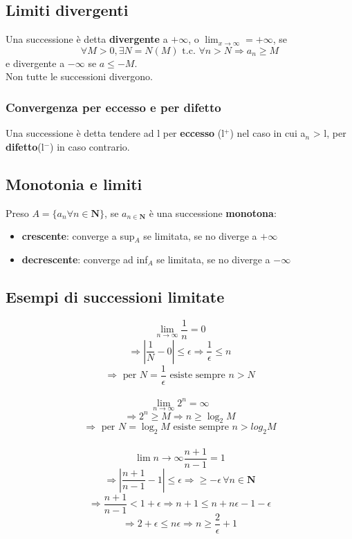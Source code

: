 \documentclass{report}
\begin{document}
    \subsection{Limiti divergenti}
        Una successione è detta \textbf{divergente} a $+\infty$, o 
        $\lim_{x \to \infty} = +\infty$, se $$\forall M > 0, \exists N = N\left(M\right)
        \textrm{ t.c. } \forall n > N \Longrightarrow a_n \geq M$$ e divergente a 
        $-\infty$ se $a \leq -M$. \\
        Non tutte le successioni divergono.
        \subsubsection{Convergenza per eccesso e per difetto}
            Una successione è detta tendere ad l per \textbf{eccesso} (l$^+$) nel caso 
            in cui a$_n$ > l, per \textbf{difetto}(l$^-$) in caso contrario.
    \subsection{Monotonia e limiti}
        Preso $A = \{a_n \forall n \in \mathbf{N}\}$, se $a_{n \in \mathbf{N}}$ è una successione \textbf{monotona}:
        \begin{itemize}
            \item \textbf{crescente}: converge a sup$_A$ se limitata, se no diverge a $+\infty$
            \item \textbf{decrescente}: converge ad inf$_A$ se limitata, se no diverge a $-\infty$
        \end{itemize}
    \subsection{Esempi di successioni limitate}
        $$\lim_{n \to \infty} \frac{1}{n} = 0$$ 
        $$\Longrightarrow |\frac{1}{N}-0| \leq \epsilon \Longrightarrow \frac{1}{\epsilon} \leq n$$
        $$\Longrightarrow \textrm{ per } N = \frac{1}{\epsilon} \textrm{ esiste sempre } n > N$$
        \\
        $$\lim_{n \to \infty} 2^n = \infty$$
        $$\Longrightarrow 2^n \geq M \Longrightarrow n \geq \log_2M$$
        $$\Longrightarrow \textrm{ per } N = \log_2M \textrm{ esiste sempre } n > log_2M$$ 
        \\
        $$\lim{n \to \infty} \frac{n+1}{n-1} = 1$$
        $$\Longrightarrow |\frac{n+1}{n-1} - 1| \leq \epsilon \Longrightarrow \geq -\epsilon \, \forall n \in \mathbf{N}$$
        $$\Longrightarrow \frac{n+1}{n-1} < 1 + \epsilon \Longrightarrow n+1 \leq n + n\epsilon -1 - \epsilon$$
        $$\Longrightarrow 2 + \epsilon \leq n\epsilon \Longrightarrow n \geq \frac{2}{\epsilon} + 1$$
\end{document}
